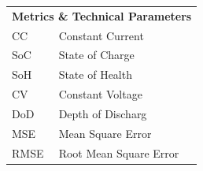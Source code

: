 \begin{longtable}{ll}
\multicolumn{2}{l}{\textbf{Metrics \& Technical Parameters}} \\
CC  & Constant Current \\
SoC & State of Charge \\
SoH & State of Health \\
CV  & Constant Voltage  \\
DoD & Depth of Discharg \\
MSE & Mean Square Error  \\
RMSE & Root Mean Square Error \\
\end{longtable}

